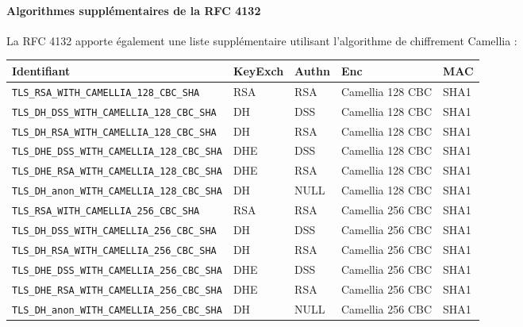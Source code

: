 \documentclass[a4paper,11pt,french]{article}
\begin{document}
\paragraph{Algorithmes supplémentaires de la RFC 4132} 
La RFC 4132 apporte également une liste supplémentaire utilisant l'algorithme de chiffrement Camellia :
\begin{center}
\begin{tabularx}{17cm}{|l|l|l|X|l|}
\hline
\textbf{Identifiant} & \textbf{KeyExch} & \textbf{Authn}& \textbf{Enc}& \textbf{MAC}\\
\hline
\verb+TLS_RSA_WITH_CAMELLIA_128_CBC_SHA+&RSA&RSA&Camellia 128 CBC&SHA1\\
\hline
\verb+TLS_DH_DSS_WITH_CAMELLIA_128_CBC_SHA+&DH&DSS&Camellia 128 CBC&SHA1\\
\hline 
\verb+TLS_DH_RSA_WITH_CAMELLIA_128_CBC_SHA+&DH&RSA&Camellia 128 CBC&SHA1\\
\hline 
\verb+TLS_DHE_DSS_WITH_CAMELLIA_128_CBC_SHA+&DHE&DSS&Camellia 128 CBC&SHA1\\
\hline
\verb+TLS_DHE_RSA_WITH_CAMELLIA_128_CBC_SHA+&DHE&RSA&Camellia 128 CBC&SHA1\\
\hline
\verb+TLS_DH_anon_WITH_CAMELLIA_128_CBC_SHA+ &DH&NULL&Camellia 128 CBC&SHA1\\
\hline
\verb+TLS_RSA_WITH_CAMELLIA_256_CBC_SHA+&RSA&RSA&Camellia 256 CBC&SHA1 \\
\hline
\verb+TLS_DH_DSS_WITH_CAMELLIA_256_CBC_SHA+& DH&DSS&Camellia 256 CBC&SHA1\\
\hline
\verb+TLS_DH_RSA_WITH_CAMELLIA_256_CBC_SHA+&DH&RSA&Camellia 256 CBC&SHA1\\
\hline
\verb+TLS_DHE_DSS_WITH_CAMELLIA_256_CBC_SHA+& DHE&DSS&Camellia 256 CBC&SHA1\\
\hline
\verb+TLS_DHE_RSA_WITH_CAMELLIA_256_CBC_SHA+& DHE&RSA&Camellia 256 CBC&SHA1\\
\hline
\verb+TLS_DH_anon_WITH_CAMELLIA_256_CBC_SHA+& DH&NULL&Camellia 256 CBC&SHA1\\
\hline
\end{tabularx}
\end{center}
\end{document}
